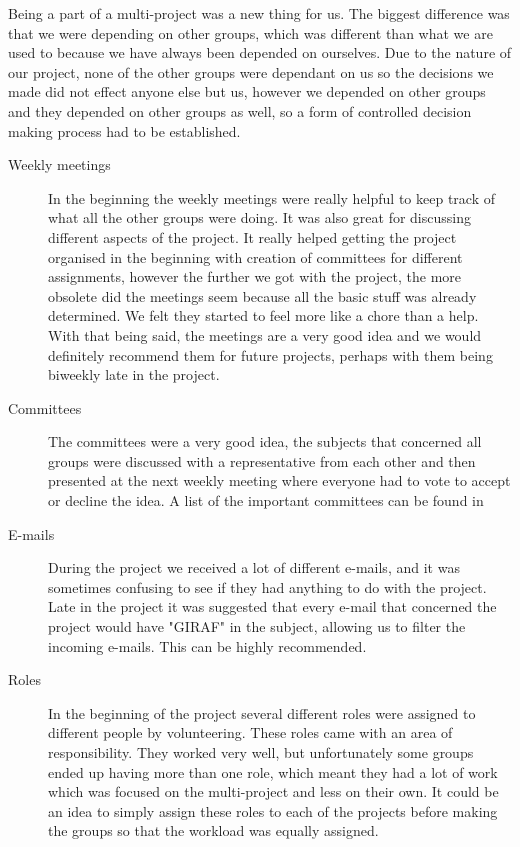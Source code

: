 Being a part of a multi-project was a new thing for us. The biggest difference was that we were depending on other groups, which was different than what we are used to because we have always been depended on ourselves. Due to the nature of our project, none of the other groups were dependant on us so the decisions we made did not effect anyone else but us, however we depended on other groups and they depended on other groups as well, so a form of controlled decision making process had to be established. 

\begin{description}
\item[Weekly meetings]In the beginning the weekly meetings  were really helpful to keep track of what all the other groups were doing. It was also great for discussing different aspects of the project. It really helped getting the project organised in the beginning with creation of committees for different assignments, however the further we got with the project, the more obsolete did the meetings seem because all the basic stuff was already determined. We felt they started to feel more like a chore than a help. With that being said, the meetings are a very good idea and we would definitely recommend them for future projects, perhaps with them being biweekly late in the project. 

\item[Committees] The committees were a very good idea, the subjects that concerned all groups were discussed with a representative from each other and then presented at the next weekly meeting where everyone had to vote to accept or decline the idea. A list of the important committees can be found in 

\item[E-mails] During the project we received a lot of different e-mails, and it was sometimes confusing to see if they had anything to do with the project. Late in the project it was suggested that every e-mail that concerned the project would have "GIRAF" in the subject, allowing us to filter the incoming e-mails. This can be highly recommended. 

\item[Roles] In the beginning of the project several different roles were assigned to different people by volunteering. These roles came with an area of responsibility. They worked very well, but unfortunately some groups ended up having more than one role, which meant they had a lot of work which was focused on the multi-project and less on their own. It could be an idea to simply assign these roles to each of the projects before making the groups so that the workload was equally assigned. 


\end{description}
